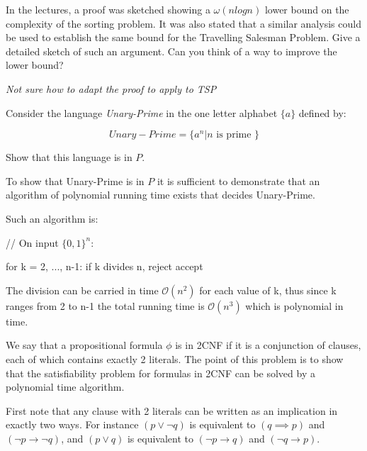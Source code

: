 \documentclass{supervision}
\begin{document}
  \begin{questions}
    \question In the lectures, a proof was sketched showing a $\omega(n log n)$
      lower bound on the complexity of the sorting problem. It was also stated
      that a similar analysis could be used to establish the same bound for the
      Travelling Salesman Problem. Give a detailed sketch of such an argument.
      Can you think of a way to improve the lower bound?

      \begin{solution}
        \emph{Not sure how to adapt the proof to apply to TSP}
      \end{solution}

    \question Consider the language \emph{Unary-Prime} in the one letter
      alphabet $\{ a \}$ defined by:

      \begin{equation*}
        {Unary-Prime} = \{ a^n | n \mbox{ is prime } \}
      \end{equation*}

      Show that this language is in $P$.

      \begin{solution}
        To show that Unary-Prime is in $P$ it is sufficient to demonstrate that
        an algorithm of polynomial running time exists that decides Unary-Prime.

        Such an algorithm is:

        \begin{code}{{}}
          // On input $\{ 0,1 \}^n$:

          for k = 2, ..., n-1:
              if k divides n, reject
          accept
        \end{code}

        The division can be carried in time $\mathcal{O}(n^2)$ for each value
        of k, thus since k ranges from 2 to n-1 the total running time is
        $\mathcal{O}(n^3)$ which is polynomial in time.
      \end{solution}

    \question We say that a propositional formula $\phi$ is in 2CNF if it is a
      conjunction of clauses, each of which contains exactly 2 literals. The
      point of this problem is to show that the satisfiability problem for
      formulas in 2CNF can be solved by a polynomial time algorithm.

      First note that any clause with 2 literals can be written as an
      implication in exactly two ways. For instance $(p \lor \lnot q)$ is
      equivalent to $(q \implies p)$ and $(\lnot p \rightarrow \lnot q)$, and
      $(p \lor q)$ is equivalent to $(\lnot p \rightarrow q)$ and $(\lnot q
      \rightarrow p)$.


\end{questions}
\end{document}
